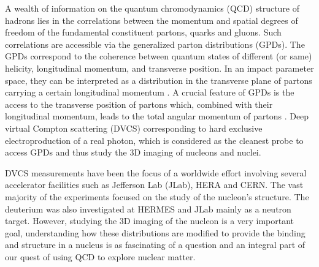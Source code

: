 \documentclass[nofootinbib,twocolumn,showpacs,prl,superscriptaddress,secnumarabic,amssymb,nobibnotes,aps,floatfix]{revtex4}
\begin{document}
A wealth of information on the quantum chromodynamics (QCD) structure of 
hadrons lies in the correlations between the momentum and spatial degrees of 
freedom of the fundamental constituent partons, quarks and gluons. Such 
correlations are accessible via the generalized parton distributions (GPDs).  
The GPDs correspond to the coherence between quantum states of different (or 
same) helicity, longitudinal momentum, and transverse position. In an impact 
parameter space, they can be interpreted as a distribution in the transverse 
plane of partons carrying a certain longitudinal momentum 
\cite{Burkardt:2000za,Diehl:2002he,Belitsky:2002ep}. A crucial feature of GPDs 
is the access to the transverse position of partons which, combined with their 
longitudinal momentum, leads to the total angular momentum of partons 
\cite{Burkardt:2005hp}. Deep virtual Compton scattering (DVCS) corresponding to 
hard exclusive electroproduction of a real photon, which is considered as the 
cleanest probe to access GPDs and thus study the 3D imaging of nucleons and 
nuclei.

DVCS measurements have been the focus of a worldwide effort 
\cite{Stepanyan:2001sm,Airapetian,Chekanov:2003ya,Aktas:2005ty,Chen:2006na,Munoz 
Camacho:2006hx,Girod:2007aa,Gavalian:2009,Seder:2015,Pisano:2015,Jo:2015ema} 
involving several accelerator facilities such as Jefferson Lab (JLab), HERA and  
CERN. The vast majority of the experiments focused on the study of the 
nucleon's structure. The deuterium was also investigated at HERMES and JLab 
\cite{Mazouz:2007aa} mainly as a neutron target. However, studying the 3D 
imaging of the nucleon is a very important goal, understanding how these 
distributions are modified to provide the binding and structure in a nucleus is 
as fascinating of a question and an integral part of our quest of using QCD to 
explore nuclear matter. 
\end{document}
